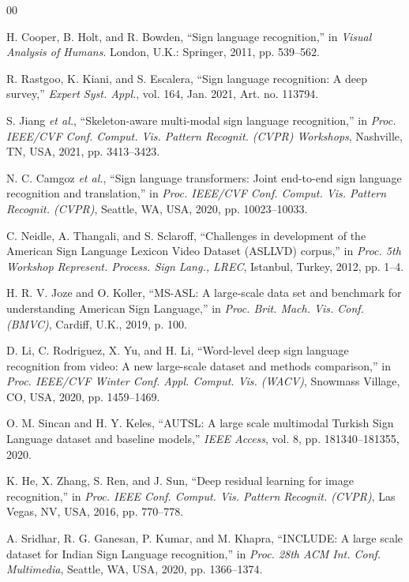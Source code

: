 \documentclass{ieeeaccess}
\begin{document}
\begin{thebibliography}{00}

H. Cooper, B. Holt, and R. Bowden, ``Sign language recognition,'' in \emph{Visual Analysis of Humans}. London, U.K.: Springer, 2011, pp. 539--562.

R. Rastgoo, K. Kiani, and S. Escalera, ``Sign language recognition: A deep survey,'' \emph{Expert Syst. Appl.}, vol. 164, Jan. 2021, Art. no. 113794.

S. Jiang \emph{et al.}, ``Skeleton-aware multi-modal sign language recognition,'' in \emph{Proc. IEEE/CVF Conf. Comput. Vis. Pattern Recognit. (CVPR) Workshops}, Nashville, TN, USA, 2021, pp. 3413--3423.

N. C. Camgoz \emph{et al.}, ``Sign language transformers: Joint end-to-end sign language recognition and translation,'' in \emph{Proc. IEEE/CVF Conf. Comput. Vis. Pattern Recognit. (CVPR)}, Seattle, WA, USA, 2020, pp. 10023--10033.

C. Neidle, A. Thangali, and S. Sclaroff, ``Challenges in development of the American Sign Language Lexicon Video Dataset (ASLLVD) corpus,'' in \emph{Proc. 5th Workshop Represent. Process. Sign Lang., LREC}, Istanbul, Turkey, 2012, pp. 1--4.

H. R. V. Joze and O. Koller, ``MS-ASL: A large-scale data set and benchmark for understanding American Sign Language,'' in \emph{Proc. Brit. Mach. Vis. Conf. (BMVC)}, Cardiff, U.K., 2019, p. 100.

D. Li, C. Rodriguez, X. Yu, and H. Li, ``Word-level deep sign language recognition from video: A new large-scale dataset and methods comparison,'' in \emph{Proc. IEEE/CVF Winter Conf. Appl. Comput. Vis. (WACV)}, Snowmass Village, CO, USA, 2020, pp. 1459--1469.

O. M. Sincan and H. Y. Keles, ``AUTSL: A large scale multimodal Turkish Sign Language dataset and baseline models,'' \emph{IEEE Access}, vol. 8, pp. 181340--181355, 2020.

K. He, X. Zhang, S. Ren, and J. Sun, ``Deep residual learning for image recognition,'' in \emph{Proc. IEEE Conf. Comput. Vis. Pattern Recognit. (CVPR)}, Las Vegas, NV, USA, 2016, pp. 770--778.

A. Sridhar, R. G. Ganesan, P. Kumar, and M. Khapra, ``INCLUDE: A large scale dataset for Indian Sign Language recognition,'' in \emph{Proc. 28th ACM Int. Conf. Multimedia}, Seattle, WA, USA, 2020, pp. 1366--1374.


\end{thebibliography}
\end{document}
